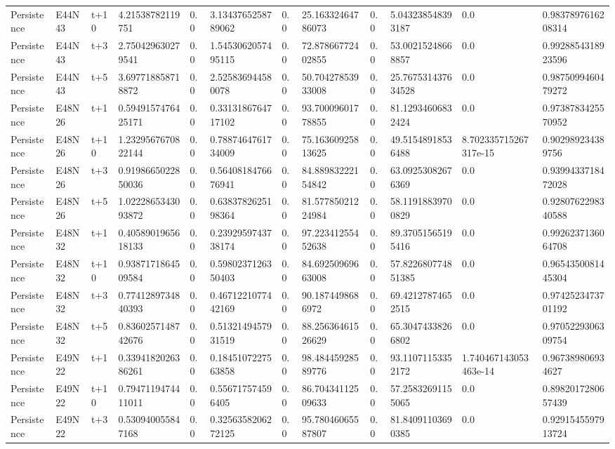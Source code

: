 \begin{landscape}
\begin{longtable}{llllllllllll}
Persistence & E44N43 & t+10 & 4.21538782119751 & 0.0 & 3.1343765258789062 & 0.0 & 25.16332464786073 & 0.0 & 5.043238548393187 & 0.0 & 0.9837897616208314 \\
Persistence & E44N43 & t+3 & 2.750429630279541 & 0.0 & 1.5453062057495115 & 0.0 & 72.87866772402855 & 0.0 & 53.00215248668857 & 0.0 & 0.9928854318923596 \\
Persistence & E44N43 & t+5 & 3.697718858718872 & 0.0 & 2.525836944580078 & 0.0 & 50.70427853933008 & 0.0 & 25.767531437634528 & 0.0 & 0.9875099460479272 \\
Persistence & E48N26 & t+1 & 0.5949157476425171 & 0.0 & 0.3313186764717102 & 0.0 & 93.70009601778855 & 0.0 & 81.12934606832424 & 0.0 & 0.9738783425570952 \\
Persistence & E48N26 & t+10 & 1.2329567670822144 & 0.0 & 0.7887464761734009 & 0.0 & 75.16360925813625 & 0.0 & 49.51548918536488 & 8.702335715267317e-15 & 0.902989234389756 \\
Persistence & E48N26 & t+3 & 0.9198665022850036 & 0.0 & 0.5640818476676941 & 0.0 & 84.88983222154842 & 0.0 & 63.09253082676369 & 0.0 & 0.9399433718472028 \\
Persistence & E48N26 & t+5 & 1.0222865343093872 & 0.0 & 0.6383782625198364 & 0.0 & 81.57785021224984 & 0.0 & 58.11918839700829 & 0.0 & 0.9280762298340588 \\
Persistence & E48N32 & t+1 & 0.4058901965618133 & 0.0 & 0.2392959743738174 & 0.0 & 97.22341255452638 & 0.0 & 89.37051565195416 & 0.0 & 0.9926237136064708 \\
Persistence & E48N32 & t+10 & 0.9387171864509584 & 0.0 & 0.5980237126350403 & 0.0 & 84.69250969663008 & 0.0 & 57.822680774851385 & 0.0 & 0.9654350081445304 \\
Persistence & E48N32 & t+3 & 0.7741289734840393 & 0.0 & 0.4671221077442169 & 0.0 & 90.1874498686972 & 0.0 & 69.42127874652515 & 0.0 & 0.9742523473701192 \\
Persistence & E48N32 & t+5 & 0.8360257148742676 & 0.0 & 0.5132149457931519 & 0.0 & 88.25636461526629 & 0.0 & 65.30474338266802 & 0.0 & 0.9705229306309754 \\
Persistence & E49N22 & t+1 & 0.3394182026386261 & 0.0 & 0.1845107227563858 & 0.0 & 98.48445928589776 & 0.0 & 93.11071153352172 & 1.740467143053463e-14 & 0.967389806934627 \\
Persistence & E49N22 & t+10 & 0.7947119474411011 & 0.0 & 0.556717574596405 & 0.0 & 86.70434112509633 & 0.0 & 57.25832691155065 & 0.0 & 0.8982017280657439 \\
Persistence & E49N22 & t+3 & 0.530940055847168 & 0.0 & 0.3256358206272125 & 0.0 & 95.78046065587807 & 0.0 & 81.84091103690385 & 0.0 & 0.9291545597913724 \\

\end{longtable}
\end{landscape}
